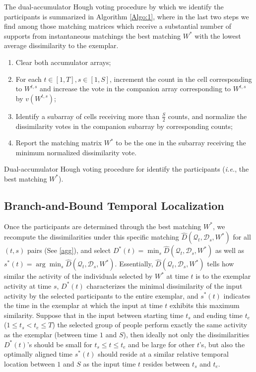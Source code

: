 \documentclass[10pt,twocolumn,letterpaper]{article}
\begin{document}
The dual-accumulator Hough voting procedure by which we identify the participants is summarized in Algorithm \ref{Algo:1}, where in the last two steps we find among those matching matrices which receive a substantial number of supports from instantaneous matchings the best matching $W^{*}$ with the lowest average dissimilarity to the exemplar.
\begin{algorithm}
\footnotesize{
\begin{enumerate}
\item Clear both accumulator arrays;
\item For each $t\in[1,T], s\in[1,S]$, increment the count in the cell corresponding to $W^{t,s}$ and increase the vote in the companion array corresponding to $W^{t,s}$ by $v(W^{t,s})$;
\item Identify a subarray of cells receiving more than $\frac{S}{2}$ counts, and normalize the dissimilarity votes in the companion subarray by corresponding counts;
\item Report the matching matrix $W^{*}$ to be the one in the subarray receiving the minimum normalized dissimilarity vote.
\end{enumerate}
}
\caption{\small Dual-accumulator Hough voting procedure for identify the participants (\textit{i.e.}, the best matching $W^{*}$).}
\label{Algo:1}
\end{algorithm}



\subsection{Branch-and-Bound Temporal Localization}
\label{BB}


Once the participants are determined through the best matching $W^{*}$, we recompute the dissimilarities under this specific matching $\hat{D}(\mathcal{Q}_{t}, \mathcal{D}_{s}, W^{*})$ for all $(t,s)$ pairs (See \ref{agg}), and select $D^{*}(t)=\min_{s}\hat{D}(\mathcal{Q}_{t}, \mathcal{D}_{s}, W^{*})$ as well as $s^{*}(t)=\arg\min_{s}\hat{D}(\mathcal{Q}_{t}, \mathcal{D}_{s}, W^{*})$. Essentially, $\hat{D}(\mathcal{Q}_{t}, \mathcal{D}_{s}, W^{*})$ tells how similar the activity of the individuals selected by $W^{*}$ at time $t$ is to the exemplar activity at time $s$, $D^{*}(t)$ characterizes the minimal dissimilarity of the input activity by the selected participants to the entire exemplar, and $s^{*}(t)$ indicates the time in the exemplar at which the input at time $t$ exhibits this maximum similarity.  Suppose that in the input between starting time $t_{s}$ and ending time $t_{e}$ ($1\leq t_{s}<t_{e}\leq T$) the selected group of people perform exactly the same activity as the exemplar (between time $1$ and $S$), then ideally not only the dissimilarities $D^{*}(t)$'s should be small for $t_{s}\le t\le t_{e}$ and be large for other $t$'s, but also the optimally aligned time $s^{*}(t)$ should reside at a similar relative temporal location between $1$ and $S$ as the input time $t$ resides between $t_{s}$ and $t_{e}$.
\end{document}
